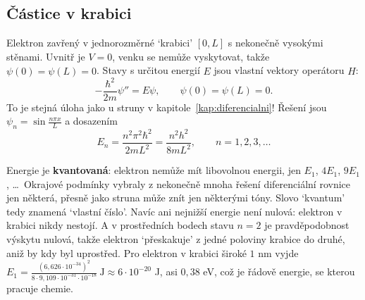 \subsection{Částice v krabici}

Elektron zavřený v jednorozměrné `krabici' $[0, L]$ s nekonečně vysokými stěnami. Uvnitř je $V = 0$, venku se nemůže vyskytovat, takže $\psi(0) = \psi(L) = 0$. Stavy s určitou energií $E$ jsou vlastní vektory operátoru $\hat{H}$:
\begin{equation*}
  -\frac{\hbar^2}{2m}\psi'' = E\psi,\qquad\psi(0) = \psi(L) = 0.
\end{equation*}
To je stejná úloha jako u struny v kapitole~\ref{kap:diferencialni}! Řešení jsou $\psi_n = \sin\frac{n\pi x}{L}$ a dosazením
\begin{equation*}
  E_n = \frac{n^2\pi^2\hbar^2}{2mL^2} = \frac{n^2h^2}{8mL^2},\qquad n = 1, 2, 3, \dots
\end{equation*}

\begin{center}
\end{center}

Energie je \textbf{kvantovaná}: elektron nemůže mít libovolnou energii, jen $E_1$, $4E_1$, $9E_1$, \dots\ Okrajové podmínky vybraly z nekonečně mnoha řešení diferenciální rovnice jen některá, přesně jako struna může znít jen některými tóny. Slovo `kvantum' tedy znamená `vlastní číslo'. Navíc ani nejnižší energie není nulová: elektron v krabici nikdy nestojí. A v prostředních bodech stavu $n = 2$ je pravděpodobnost výskytu nulová, takže elektron `přeskakuje' z jedné poloviny krabice do druhé, aniž by kdy byl uprostřed. Pro elektron v krabici široké $1$ nm vyjde $E_1 = \frac{{(6{,}626\cdot 10^{-34})}^2}{8\cdot 9{,}109\cdot 10^{-31}\cdot 10^{-18}}\ \mathrm{J}\approx 6\cdot 10^{-20}$ J, asi $0{,}38$ eV, což je řádově energie, se kterou pracuje chemie.

